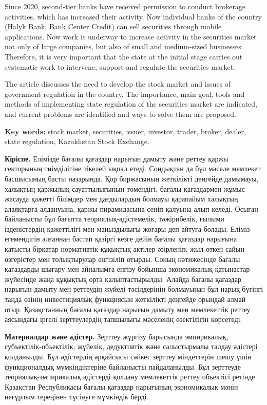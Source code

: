 Since 2020, second-tier banks have received permission to conduct
brokerage activities, which has increased their activity. Now individual
banks of the country (Halyk Bank, Bank Center Credit) can sell
securities through mobile applications. Now work is underway to increase
activity in the securities market not only of large companies, but also
of small and medium-sized businesses. Therefore, it is very important
that the state at the initial stage carries out systematic work to
intervene, support and regulate the securities market.

The article discusses the need to develop the stock market and issues of
government regulation in the country. The importance, main goal, tools
and methods of implementing state regulation of the securities market
are indicated, and current problems are identified and ways to solve
them are proposed.

{\bfseries Key words:} stock market, securities, issuer, investor, trader,
broker, dealer, state regulation, Kazakhstan Stock Exchange.

{\bfseries Кіріспе.} Елімізде бағалы қағаздар нарығын дамыту және реттеу
қаржы секторының тиімділігіне тікелей ықпал етеді. Сондықтан да бұл
мәселе мемлекет басшысының басты назарында. Қор биржасының жеткілікті
деңгейде дамымауы, халықтың қаржылық сауаттылығының төмендігі, бағалы
қағаздармен жұмыс жасауда қажетті білімдер мен дағдылардың болмауы
қарапайым халықтың алаяқтарға алдануына, қаржы пирамидасына сеніп
қалуына алып келеді. Осыған байланысты бұл бағытта
теориялық-әдістемелік, тәжірибелік, ғылыми ізденістердің қажеттілігі мен
маңыздылығы жоғары деп айтуға болады. Еліміз егемендігін алғаннан бастап
қазіргі кезге дейін бағалы қағаздар нарығына қатысты бірқатар
нормативтік-құқықтық актілер әзірленіп, жыл өткен сайын өзгерістер мен
толықтырулар енгізіліп отырды. Соның нәтижесінде бағалы қағаздарды
шығару мен айналымға енгізу бойынша экономикалық қатынастар жүйесінде
жаңа құқықтық орта қалыптастырылды. Алайда бағалы қағаздар нарығын
дамыту мен реттеудің жүйелі тәсілдерінің болмауынан бұл нарық бүгінгі
таңда өзінің инвестициялық функциясын жеткілікті деңгейде орындай алмай
отыр. Қазақстанның бағалы қағаздар нарығын дамыту мен мемлекеттік реттеу
аясындағы іргелі зерттеулердің тапшылығы мәселенің өзектілігін
көрсетеді.

{\bfseries Материалдар және әдістер.} Зерттеу жүргізу барысында
эмпирикалық, субъектілік-объектілік, жүйелік, дедуктивтік және
салыстырмалы талдау әдістері қолданылды. Бұл әдістердің әрқайсысы сәйкес
зерттеу міндеттерін шешу үшін функционалдық мүмкіндіктеріне байланысты
пайдаланылды. Бұл зерттеуде теориялық-эмпирикалық әдістерді қолдану
мемлекеттік реттеу объектісі ретінде Қазақстан Республикасы бағалы
қағаздар нарығының экономикалық мәнін неғұрлым тереңінен түсінуге
мүмкіндік берді.

